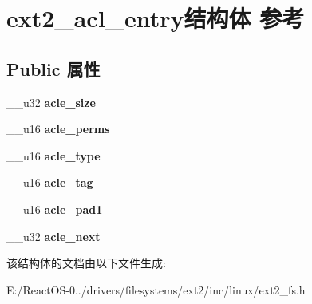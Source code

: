 \hypertarget{structext2__acl__entry}{}\section{ext2\+\_\+acl\+\_\+entry结构体 参考}
\label{structext2__acl__entry}
\subsection*{Public 属性}
\begin{DoxyCompactItemize}
\item 
\mbox{\label{structext2__acl__entry_af65983271e7578e0fdb1d5030b367add}} 
\+\_\+\+\_\+u32 {\bfseries acle\+\_\+size}
\item 
\mbox{\label{structext2__acl__entry_aafaa04e64f88c2dba7914fd9b0d98133}} 
\+\_\+\+\_\+u16 {\bfseries acle\+\_\+perms}
\item 
\mbox{\label{structext2__acl__entry_aae89c6a07d90776f53b69c91b52f46ae}} 
\+\_\+\+\_\+u16 {\bfseries acle\+\_\+type}
\item 
\mbox{\label{structext2__acl__entry_acc0b008b3af6ad4dd76bde2e43b2ce50}} 
\+\_\+\+\_\+u16 {\bfseries acle\+\_\+tag}
\item 
\mbox{\label{structext2__acl__entry_a0315a3b5c25b27414c1efe6d1ed00040}} 
\+\_\+\+\_\+u16 {\bfseries acle\+\_\+pad1}
\item 
\mbox{\label{structext2__acl__entry_a52fe9f34201ff47a637434e7cbacfb2b}} 
\+\_\+\+\_\+u32 {\bfseries acle\+\_\+next}
\end{DoxyCompactItemize}


该结构体的文档由以下文件生成\+:\begin{DoxyCompactItemize}
\item 
E\+:/\+React\+O\+S-\/0../drivers/filesystems/ext2/inc/linux/ext2\+\_\+fs.\+h\end{DoxyCompactItemize}
